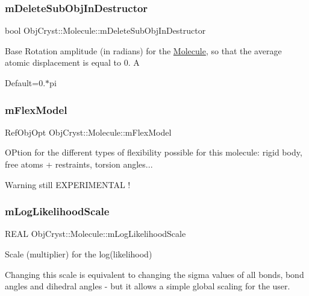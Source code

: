 \subsubsection{\texorpdfstring{mDeleteSubObjInDestructor}{mDeleteSubObjInDestructor}}
{\footnotesize\ttfamily bool Obj\+Cryst\+::\+Molecule\+::m\+Delete\+Sub\+Obj\+In\+Destructor}

Base Rotation amplitude (in radians) for the \mbox{\hyperlink{class_obj_cryst_1_1_molecule}{Molecule}}, so that the average atomic displacement is equal to 0. A

Default=0.$\ast$pi \mbox{\label{class_obj_cryst_1_1_molecule_a35881bfb20092d0dcc424553f5671245}} 
\subsubsection{\texorpdfstring{mFlexModel}{mFlexModel}}
{\footnotesize\ttfamily Ref\+Obj\+Opt Obj\+Cryst\+::\+Molecule\+::m\+Flex\+Model}

O\+Ption for the different types of flexibility possible for this molecule\+: rigid body, free atoms + restraints, torsion angles... \begin{DoxyWarning}{Warning}
still E\+X\+P\+E\+R\+I\+M\+E\+N\+T\+AL ! 
\end{DoxyWarning}
\mbox{\label{class_obj_cryst_1_1_molecule_a7e69eecc5aa10a9908c3a6450cc2540b}} 
\subsubsection{\texorpdfstring{mLogLikelihoodScale}{mLogLikelihoodScale}}
{\footnotesize\ttfamily R\+E\+AL Obj\+Cryst\+::\+Molecule\+::m\+Log\+Likelihood\+Scale}

Scale (multiplier) for the log(likelihood)

Changing this scale is equivalent to changing the sigma values of all bonds, bond angles and dihedral angles -\/ but it allows a simple global scaling for the user. \mbox{\label{class_obj_cryst_1_1_molecule_a600a62199c1e9297d39a53848a155310}} 
